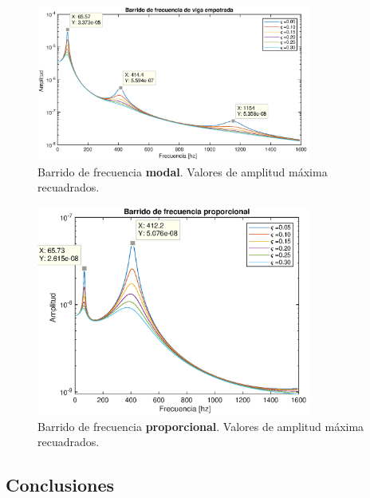 \documentclass[onecolumn,10pt,titlepage,a4paper]{article}
\begin{document}
\begin{figure}[htb!]
	\centering
	\includegraphics[width=0.8\textwidth]{fig/sinesweep.eps}
	\caption{Barrido de frecuencia \textbf{modal}. Valores de amplitud máxima recuadrados.}
\end{figure}

\begin{figure}[htb!]
	\centering
	\includegraphics[width=0.8\textwidth]{fig/sinesweepprop.eps}
	\caption{Barrido de frecuencia \textbf{proporcional}. Valores de amplitud máxima recuadrados.}
\end{figure}


\subsection{Conclusiones}


\clearpage
 
\end{document}
